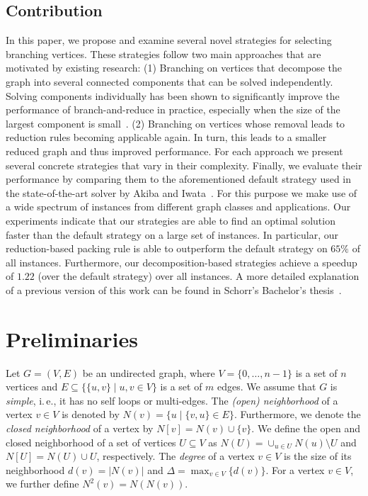 \documentclass[a4paper,UKenglish,cleveref, autoref, thm-restate]{lipics-v2021}
\newcommand{\ie}{i.\,e.,\xspace}
\begin{document}
\subsection{Contribution}
In this paper, we propose and examine several novel strategies for selecting branching vertices.
These strategies follow two main approaches that are motivated by existing research: (1) Branching on vertices that decompose the graph into several connected components that can be solved independently.
Solving components individually has been shown to significantly improve the performance of branch-and-reduce in practice, especially when the size of the largest component is small~\cite{alsahafy2020computing}.
(2) Branching on vertices whose removal leads to reduction rules becoming applicable again.
In turn, this leads to a smaller reduced graph and thus improved performance.
For each approach we present several concrete strategies that vary in their complexity.
Finally, we evaluate their performance by comparing them to the aforementioned default strategy used in the state-of-the-art solver by Akiba and Iwata~\cite{AkibaIwata}.
For this purpose we make use of a wide spectrum of instances from different graph classes and applications.
Our experiments indicate that our strategies are able to find an optimal
solution faster than the default strategy on a large set of instances.
In particular, our reduction-based packing rule is able to outperform the default strategy on $65\%$ of all instances.
Furthermore, our decomposition-based strategies achieve a speedup of $1.22$ (over the default strategy) over all instances.
A more detailed explanation of a previous version of this work
can be found in Schorr's Bachelor's thesis~\cite{schorr2020improved}.

\section{Preliminaries}
Let $G=(V,E)$ be an undirected graph, where $V = \{0, \ldots, n-1\}$ is a set of $n$ vertices and $E \subseteq  \{\{u,v\} \mid u,v \in V\}$ is a set of $m$ edges. 
We assume that $G$ is \emph{simple}, \ie it has no self loops or multi-edges.
The \emph{(open) neighborhood} of a vertex $v \in V$ is denoted by $N(v) = \{u \mid \{v,u\} \in E\}$.
Furthermore, we denote the \emph{closed neighborhood} of a vertex by $N[v]=N(v) \cup \{v\}$.
We define the open and closed neighborhood of a set of vertices $U \subseteq V$
as $N(U) = \cup_{u \in U} N(u) \setminus U$ and $N[U] = N(U) \cup U$, respectively.
The \emph{degree} of a vertex $v \in V$ is the size of its neighborhood $d(v) =
|N(v)|$ and $\Delta =
\max_{v \in V} \{d(v)\}$.
For a vertex $v \in V$, we further define $N^2(v) = N(N(v))$.
\end{document}
